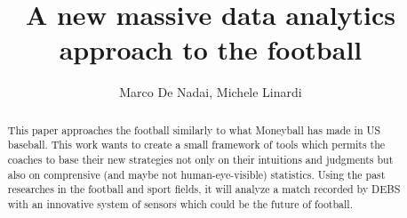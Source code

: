 \documentclass{acm_proc_article-sp-sigmod07}
\begin{document}
%

\title{A new massive data analytics approach to the football}
%

\author{Marco De Nadai, Michele Linardi}
%
\maketitle
\begin{abstract}
This paper approaches the football similarly to what Moneyball has made in US baseball. This work wants to create a small framework of tools which permits the coaches to base their new strategies not only on their intuitions and judgments but also on comprensive (and maybe not human-eye-visible) statistics. Using the past researches in the football and sport fields, it will analyze a match recorded by DEBS with an innovative system of sensors which could be the future of football. 
\end{abstract}
\end{document}
